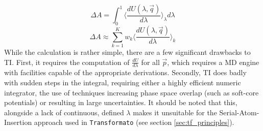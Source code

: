 \documentclass[oneside]{scrreprt}
\begin{document}
\begin{equation} \label{eq:ti_integration}
    \Delta A=\int_0^1 \biggl \langle\frac{dU(\lambda,\Vec{q})}{d\lambda} \biggr \rangle_{\lambda} d\lambda 
\end{equation}
\begin{equation} \label{eq:ti_approximation}
    \Delta A \approx \sum_{k=1}^K w_k \biggl \langle\frac{dU(\lambda,\Vec{q})}{d\lambda} \biggr \rangle_{k}
\end{equation}
While the calculation is rather simple, there are a few significant drawbacks to TI. First, it requires the computation of $\frac{dU}{d\lambda}$ for all $\Vec{p}$, which requires a MD engine with facilities capable of the appropriate derivations. Secondly, TI does badly with sudden steps in the integral, requiring either a highly efficient numeric integrator, the use of techniques increasing phase space overlap (such as soft-core potentials) or resulting in large uncertainties. It should be noted that this, alongside a lack of continuous, defined $\lambda$ makes it unsuitable for the Serial-Atom-Insertion approach used in \texttt{Transformato} (see section \ref{sec:tf_principles}).
\end{document}
